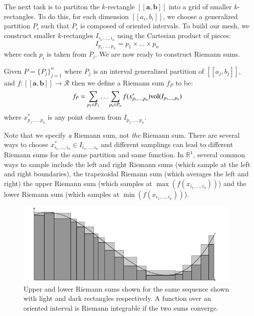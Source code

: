 The next task is to partiton the $k$-rectangle $[\![\boldsymbol{a}, \boldsymbol{b}]\!]$ into a grid of smaller
$k$-rectangles.
To do this, for each dimension $[\![a_i, b_i]\!]$, we choose a generalized partition $P_i$ such that $P_i$ is composed of
oriented intervals.
To build our mesh, we construct smaller $k$-rectangles $I_{i_1, \ldots, i_n}$ using the Cartesian product of pieces:
\begin{equation}
	I_{p_1, \ldots, p_n} = p_1 \times \ldots \times p_n
\end{equation}
where each $p_i$ is taken from $P_i$.
We are now ready to construct Riemann sums.

\begin{definition}
	Given $P=\{ P_j \}_{j=1}^n$ where $P_j$ is an interval generalized partition of $[\![a_j, b_j]\!]$,
	and $f:[\![\boldsymbol{a}, \boldsymbol{b}]\!] \to \mathcal{R}$ then we define a Riemann sum $f_P$ to be:
	\begin{equation}
		f_P = \sum_{p_1 \in P_1} \ldots \sum_{p_n \in P_n} f(x^*_{p_1, \ldots, p_n}) \text{vol}(I_{p_1, \ldots, p_n})
	\end{equation}
	where $x^*_{p_1, \ldots, p_n}$ is any point chosen from $I_{p_1, \ldots, p_n}$.
\end{definition}

Note that we specify \emph{a} Riemann sum, not \emph{the} Riemann sum.
There are several ways to choose $x^*_{i_1,\ldots,i_n} \in I_{i_1, \ldots, i_n}$ and different samplings can lead to different Riemann sums for the same partition and same function.
In $\mathbb{R}^1$, several common ways to sample include the left and right Riemann sums (which sample at the left and right boundaries), the trapezoidal Riemann sum (which averages the left and right) the upper Riemann sum (which samples at $\max(f(x_{i_1, \ldots, i_n}))$) and the lower Riemann sum (which samples at $\min(f(x_{i_1,\ldots,i_n}))$).


\begin{figure}[ht]
\caption[Riemann Integral]{Upper and lower Riemann sums shown for the same sequence shown with light and dark rectangles respectively. A function over an oriented interval is Riemann integrable if the two sums converge.}
\centering
\includegraphics[scale=0.6]{diagrams/riemann}
\end{figure}


